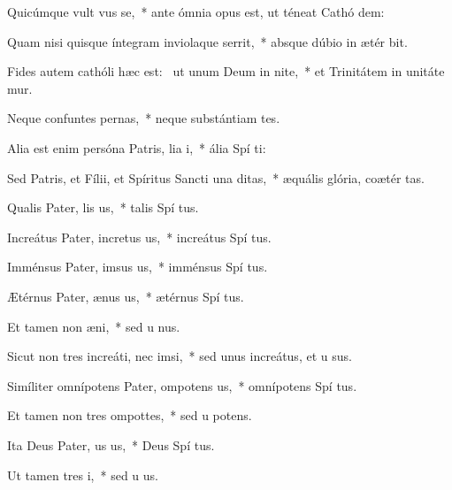 \item Quicúmque vult vus se,~* ante ómnia opus est, ut téneat Cathó dem:
\item Quam nisi quisque íntegram inviolaque serrit,~* absque dúbio in ætér bit.
\item Fides autem cathóli hæc est:~\pscross{} ut unum Deum in nite,~* et Trinitátem in unitáte mur.
\item Neque confuntes pernas,~* neque substántiam tes.
\item Alia est enim persóna Patris, lia i,~* ália Spí ti:
\item Sed Patris, et Fílii, et Spíritus Sancti una  ditas,~* æquális glória, coætér tas.
\item Qualis Pater, lis us,~* talis Spí tus.
\item Increátus Pater, incretus us,~* increátus Spí tus.
\item Imménsus Pater, imsus us,~* imménsus Spí tus.
\item Ætérnus Pater, ænus us,~* ætérnus Spí tus.
\item Et tamen non  æni,~* sed u nus.
\item Sicut non tres increáti, nec  imsi,~* sed unus increátus, et u sus.
\item Simíliter omnípotens Pater, ompotens us,~* omnípotens Spí tus.
\item Et tamen non tres ompottes,~* sed u potens.
\item Ita Deus Pater, us us,~* Deus Spí tus.
\item Ut tamen  tres i,~* sed u  us.
